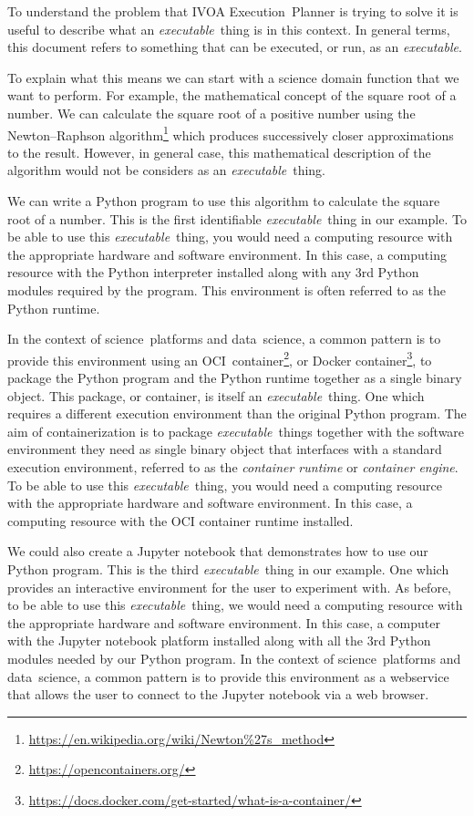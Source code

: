 \documentclass[11pt,a4paper]{ivoa}
\newcommand{\webservice} {webservice}
\newcommand{\webbrowser} {web browser}
\newcommand{\ivoa} {IVOA}
\newcommand{\executionplanner} {Execution~Planner}
\newcommand{\jupyternotebook} {Jupyter notebook}
\newcommand{\python} {Python}
\newcommand{\ocicontainer} {OCI~container}
\newcommand{\dockercontainer} {Docker container}
\newcommand{\footurl}[1] {\footnote{\url{#1}}}
\newcommand{\datascience} {data~science}
\newcommand{\scienceplatform} {science~platform}
\newcommand{\executable} {\textit{executable}}
\newcommand{\executablething} {\textit{executable}~thing}
\begin{document}
To understand the problem that \ivoa{} \executionplanner{} is trying to solve
it is useful to describe what an \executablething{} is in this context.
In general terms, this document refers to something that can be executed, or run,
as an \executable.

To explain what this means we can start with a science domain function that we want to perform.
For example, the mathematical concept of the square root of a number.
We can calculate the square root of a positive number using the Newton–Raphson
algorithm\footurl{https://en.wikipedia.org/wiki/Newton\%27s_method}
which produces successively closer approximations to the result.
However, in general case, this mathematical description of the algorithm would not be considers as an \executablething.

We can write a \python{} program to use this algorithm to calculate the square root of a number.
This is the first identifiable \executablething{} in our example.
To be able to use this \executablething{}, you would need a computing resource with the appropriate
hardware and software environment. In this case, a computing resource with the \python{} interpreter
installed along with any 3rd \python{} modules required by the program.
This environment is often referred to as the \python{} runtime.

In the context of \scienceplatform{}s and \datascience{}, a common pattern is to provide this environment
using an \ocicontainer{}\footurl{https://opencontainers.org/},
or \dockercontainer\footurl{https://docs.docker.com/get-started/what-is-a-container/},
to package the \python{} program and the \python{} runtime together as a single binary object.
This package, or container, is itself an \executablething{}. One which requires a different execution
environment than the original \python{} program.
The aim of containerization is to package \executablething{}s together with the software environment
they need as single binary object that interfaces with a standard execution environment,
referred to as the \textit{container runtime} or \textit{container engine}.
To be able to use this \executablething{}, you would need a computing resource with the appropriate
hardware and software environment. In this case, a computing resource with the OCI container runtime installed.

We could also create a \jupyternotebook{} that demonstrates how to use our \python{} program.
This is the third \executablething{} in our example.
One which provides an interactive environment for the user to experiment with.
As before, to be able to use this \executablething{}, we would need a computing resource with
the appropriate hardware and software environment.
In this case, a computer with the \jupyternotebook{} platform installed along with all the 3rd \python{} modules
needed by our \python{} program.
In the context of \scienceplatform{}s and \datascience{}, a common pattern is to provide this environment as a \webservice{}
that allows the user to connect to the \jupyternotebook{} via a \webbrowser.
\end{document}
